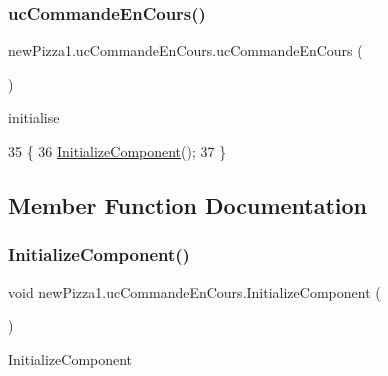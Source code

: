 \subsubsection{\texorpdfstring{uc\+Commande\+En\+Cours()}{ucCommandeEnCours()}}
{\footnotesize\ttfamily new\+Pizza1.\+uc\+Commande\+En\+Cours.\+uc\+Commande\+En\+Cours (\begin{DoxyParamCaption}{ }\end{DoxyParamCaption})\hspace{0.3cm}{\ttfamily [inline]}}



initialise 


\begin{DoxyCode}
35         \{
36             \hyperlink{classnewPizza1_1_1ucCommandeEnCours_a5838b3aa1f180eda285120814af5dadd}{InitializeComponent}();
37         \}
\end{DoxyCode}


\subsection{Member Function Documentation}
\mbox{\label{classnewPizza1_1_1ucCommandeEnCours_a5838b3aa1f180eda285120814af5dadd}} 
\subsubsection{\texorpdfstring{Initialize\+Component()}{InitializeComponent()}\hspace{0.1cm}{\footnotesize\ttfamily [1/6]}}
{\footnotesize\ttfamily void new\+Pizza1.\+uc\+Commande\+En\+Cours.\+Initialize\+Component (\begin{DoxyParamCaption}{ }\end{DoxyParamCaption})\hspace{0.3cm}{\ttfamily [inline]}}



Initialize\+Component 


